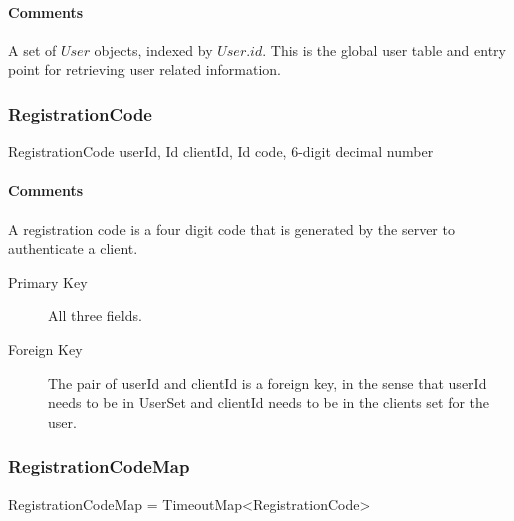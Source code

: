 \documentclass[a4paper,10pt]{article}
\begin{document}
\begin{inparaitem}[ ]
 \item \secure
 \item \persistent
 \item \unique
\end{inparaitem}

\paragraph*{Comments}
A set of $User$ objects, indexed by $User.id$. This is the global user table and entry point for retrieving user related information.

\subsubsection{RegistrationCode}

\begin{verbbox}
RegistrationCode
{
  userId, Id
  clientId, Id
  code, 6-digit decimal number
}
\end{verbbox}
\begin{center}
\theverbbox
\end{center}

\begin{inparaitem}[ ]
 \item \infrastructure
\end{inparaitem}

\paragraph*{Comments}
A registration code is a four digit code that is generated by the server to authenticate a client.

\SpecialItem
\begin{description}
 \item[Primary Key] All three fields.
 \item[Foreign Key] The pair of userId and clientId is a foreign key, in the sense that userId needs to be in UserSet and clientId needs to be in the clients set for the user.
\end{description}

\subsubsection{RegistrationCodeMap}
\label{sec:structure:RegistrationCodeMap}

\begin{verbbox}
RegistrationCodeMap = TimeoutMap<RegistrationCode>
\end{verbbox}
\begin{center}
\theverbbox
\end{center}
\end{document}
